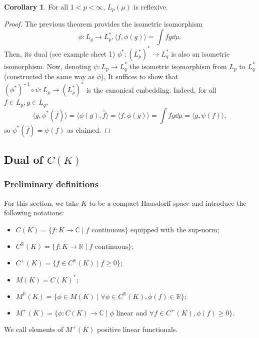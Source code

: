 \documentclass[]{article}
\theoremstyle{definition}
\newtheorem{corollary}{Corollary}[theorem]
\begin{document}
\begin{corollary}
  For all \(1 < p < \infty\), \(L_p(\mu)\) is reflexive. 
\end{corollary}
\begin{proof}
  The previous theorem provides the isometric isomorphism 
  \[\phi : L_q \to L_p^*, \langle f, \phi(g)\rangle = \int fg \dd \mu.\]
  Then, its dual (see example sheet 1) \(\phi^* : (L_p^*)^* \to L_q^*\) is also an isometric 
  isomorphism. Now, denoting \(\psi : L_p \to L_q^*\) the isometric isomorphism from \(L_p\) to 
  \(L_q^*\) (constructed the same way as \(\phi\)), It suffices to show that 
  \((\phi^*)^{-1} \circ \psi : L_p \to (L_p^*)^*\) is the canonical embedding. Indeed, 
  for all \(f \in L_p, g \in L_q\), 
  \[\langle g, \phi^*(\hat f) \rangle = \langle \phi(g), \hat f\rangle = 
  \langle f, \phi(g) \rangle = \int fg \dd \mu = \langle g, \psi(f) \rangle,\]
  so \(\phi^*(\hat f) = \psi(f)\) as claimed.
\end{proof}

\subsection{Dual of \texorpdfstring{\(C(K)\)}{C(K)}}

\subsubsection{Preliminary definitions}

For this section, we take \(K\) to be a compact Hausdorff space and introduce the following 
notations:
\begin{itemize}
  \item \(C(K) = \{f : K \to \mathbb{C} \mid f \text{ continuous}\}\) equipped with the sup-norm;
  \item \(C^\mathbb{R}(K) = \{f : K \to \mathbb{R} \mid f \text{ continuous}\};\)
  \item \(C^+(K) = \{f \in C^\mathbb{R}(K) \mid f \ge 0\};\)
  \item \(M(K) = C(K)^*;\)
  \item \(M^\mathbb{R}(K) = \{\phi \in M(K) \mid \forall \phi \in C^\mathbb{R}(K), \phi(f) \in \mathbb{R}\};\)
  \item \(M^+(K) = \{\phi : C(K) \to \mathbb{C} \mid \phi \text{ linear and } \forall f \in C^+(K), \phi(f) \ge 0\}.\)
\end{itemize}

We call elements of \(M^+(K)\) positive linear functionals.
\end{document}

